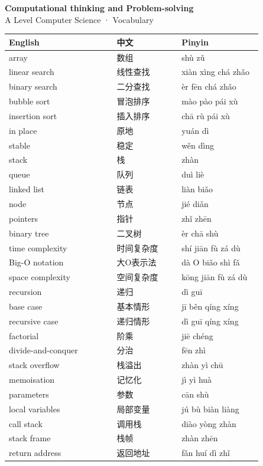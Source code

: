\documentclass[11pt]{article}
\begin{document}
\begin{center}
  {\LARGE\bfseries Computational thinking and Problem-solving}\\[0.35em]
  {\large A Level Computer Science · Vocabulary}
\end{center}
\vspace{0.6em}

\begin{longtable}{@{}p{0.40\linewidth}p{0.24\linewidth}p{0.30\linewidth}@{}}
\toprule
\textbf{English} & \textbf{中文} & \textbf{Pinyin} \\
\midrule
\endhead
\bottomrule
\endlastfoot
array & 数组 & shù zǔ \\
linear search & 线性查找 & xiàn xìng chá zhǎo \\
binary search & 二分查找 & èr fēn chá zhǎo \\
bubble sort & 冒泡排序 & mào pào pái xù \\
insertion sort & 插入排序 & chā rù pái xù \\
in place & 原地 & yuán dì \\
stable & 稳定 & wěn dìng \\
stack & 栈 & zhàn \\
queue & 队列 & duì liè \\
linked list & 链表 & liàn biǎo \\
node & 节点 & jié diǎn \\
pointers & 指针 & zhǐ zhēn \\
binary tree & 二叉树 & èr chā shù \\
time complexity & 时间复杂度 & shí jiān fù zá dù \\
Big-O notation & 大O表示法 & dà O biǎo shì fǎ \\
space complexity & 空间复杂度 & kōng jiān fù zá dù \\
recursion & 递归 & dì guī \\
base case & 基本情形 & jī běn qíng xíng \\
recursive case & 递归情形 & dì guī qíng xíng \\
factorial & 阶乘 & jiē chéng \\
divide-and-conquer & 分治 & fēn zhì \\
stack overflow & 栈溢出 & zhàn yì chū \\
memoisation & 记忆化 & jì yì huà \\
parameters & 参数 & cān shù \\
local variables & 局部变量 & jú bù biàn liàng \\
call stack & 调用栈 & diào yòng zhàn \\
stack frame & 栈帧 & zhàn zhēn \\
return address & 返回地址 & fǎn huí dì zhǐ \\
\end{longtable}
\end{document}
